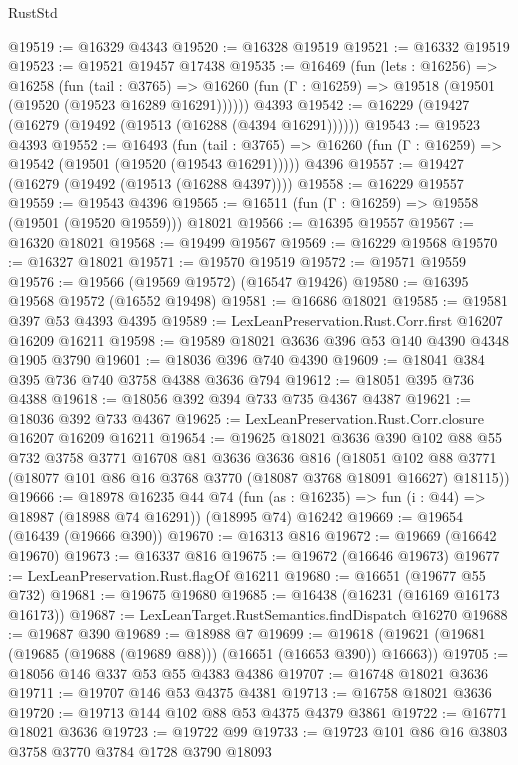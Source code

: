 \begin{lexlean}{RustStd}
\begin{coremodule}
@19519 := @16329 @4343
@19520 := @16328 @19519
@19521 := @16332 @19519
@19523 := @19521 @19457 @17438
@19535 := @16469
    (fun (lets : @16256) =>
    @16258
      (fun (tail : @3765) =>
      @16260 (fun (Γ : @16259) => @19518 (@19501 (@19520 (@19523 @16289 @16291))))))
    @4393
@19542 := @16229 (@19427 (@16279 (@19492 (@19513 (@16288 (@4394 @16291))))))
@19543 := @19523 @4393
@19552 := @16493
    (fun (tail : @3765) => @16260 (fun (Γ : @16259) => @19542 (@19501 (@19520 (@19543 @16291)))))
    @4396
@19557 := @19427 (@16279 (@19492 (@19513 (@16288 @4397))))
@19558 := @16229 @19557
@19559 := @19543 @4396
@19565 := @16511 (fun (Γ : @16259) => @19558 (@19501 (@19520 @19559))) @18021
@19566 := @16395 @19557
@19567 := @16320 @18021
@19568 := @19499 @19567
@19569 := @16229 @19568
@19570 := @16327 @18021
@19571 := @19570 @19519
@19572 := @19571 @19559
@19576 := @19566 (@19569 @19572) (@16547 @19426)
@19580 := @16395 @19568 @19572 (@16552 @19498)
@19581 := @16686 @18021
@19585 := @19581 @397 @53 @4393 @4395
@19589 := LexLeanPreservation.Rust.Corr.first @16207 @16209 @16211
@19598 := @19589 @18021 @3636 @396 @53 @140 @4390 @4348 @1905 @3790
@19601 := @18036 @396 @740 @4390
@19609 := @18041 @384 @395 @736 @740 @3758 @4388 @3636 @794
@19612 := @18051 @395 @736 @4388
@19618 := @18056 @392 @394 @733 @735 @4367 @4387
@19621 := @18036 @392 @733 @4367
@19625 := LexLeanPreservation.Rust.Corr.closure @16207 @16209 @16211
@19654 := @19625
    @18021
    @3636
    @390
    @102
    @88
    @55
    @732
    @3758
    @3771
    @16708
    @81
    @3636
    @3636
    @816
    (@18051 @102 @88 @3771 (@18077 @101 @86 @16 @3768 @3770 (@18087 @3768 @18091 @16627) @18115))
@19666 := @18978
    @16235
    @44
    @74
    (fun (as : @16235) => fun (i : @44) => @18987 (@18988 @74 @16291))
    (@18995 @74)
    @16242
@19669 := @19654 (@16439 (@19666 @390))
@19670 := @16313 @816
@19672 := @19669 (@16642 @19670)
@19673 := @16337 @816
@19675 := @19672 (@16646 @19673)
@19677 := LexLeanPreservation.Rust.flagOf @16211
@19680 := @16651 (@19677 @55 @732)
@19681 := @19675 @19680
@19685 := @16438 (@16231 (@16169 @16173 @16173))
@19687 := LexLeanTarget.RustSemantics.findDispatch @16270
@19688 := @19687 @390
@19689 := @18988 @7
@19699 := @19618 (@19621 (@19681 (@19685 (@19688 (@19689 @88))) (@16651 (@16653 @390)) @16663))
@19705 := @18056 @146 @337 @53 @55 @4383 @4386
@19707 := @16748 @18021 @3636
@19711 := @19707 @146 @53 @4375 @4381
@19713 := @16758 @18021 @3636
@19720 := @19713 @144 @102 @88 @53 @4375 @4379 @3861
@19722 := @16771 @18021 @3636
@19723 := @19722 @99
@19733 := @19723 @101 @86 @16 @3803 @3758 @3770 @3784 @1728 @3790 @18093

\end{coremodule}
\end{lexlean}
